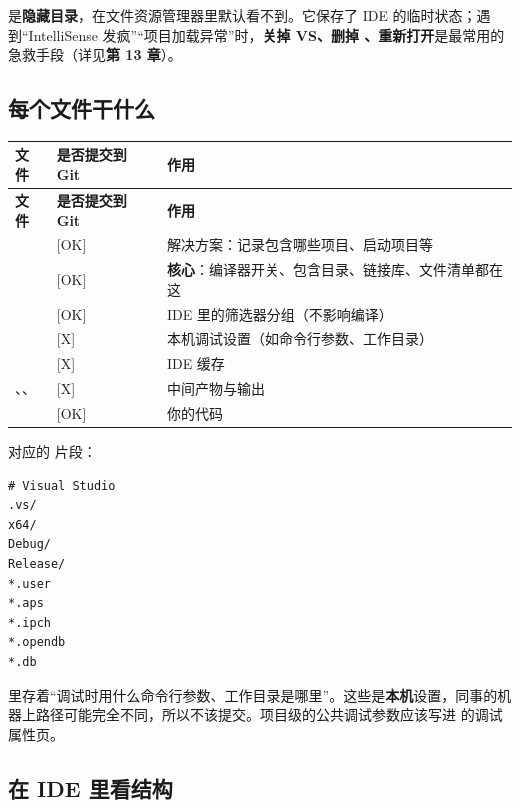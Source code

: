 \begin{warnbox}[注意]
 是\textbf{隐藏目录}，在文件资源管理器里默认看不到。它保存了 IDE 的临时状态；遇到“IntelliSense 发疯”“项目加载异常”时，\textbf{关掉 VS、删掉 、重新打开}是最常用的急救手段（详见\textbf{第 13 章}）。
\end{warnbox}

\subsection{每个文件干什么}

\begin{longtable}{L{4.6cm}L{2.6cm}L{7.4cm}}\toprule
\textbf{文件} & \textbf{是否提交到 Git} & \textbf{作用} \\ \midrule \endfirsthead
\toprule \textbf{文件} & \textbf{是否提交到 Git} & \textbf{作用} \\ \midrule \endhead
\bottomrule \endlastfoot
{} & [OK] & 解决方案：记录包含哪些项目、启动项目等 \\
 & [OK] & \textbf{核心}：编译器开关、包含目录、链接库、文件清单都在这 \\
 & [OK] & IDE 里的筛选器分组（不影响编译） \\
 & [X] & 本机调试设置（如命令行参数、工作目录） \\
 & [X] & IDE 缓存 \\
、、 & [X] & 中间产物与输出 \\
 & [OK] & 你的代码 \\
\end{longtable}

对应的  片段：

\begin{lstlisting}[style=inistyle]
# Visual Studio
.vs/
x64/
Debug/
Release/
*.user
*.aps
*.ipch
*.opendb
*.db
\end{lstlisting}

\begin{keybox}[实战场景]
 里存着“调试时用什么命令行参数、工作目录是哪里”。这些是\textbf{本机}设置，同事的机器上路径可能完全不同，所以不该提交。项目级的公共调试参数应该写进  的调试属性页。
\end{keybox}

\subsection{在 IDE 里看结构}

